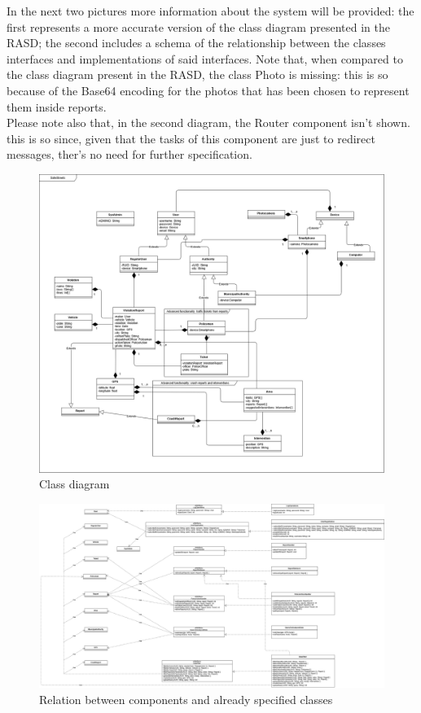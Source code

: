 In the next two pictures more information about the system will be provided: the first represents a more accurate version of the class diagram presented in the RASD; the second includes a schema of the relationship between the classes interfaces and implementations of said interfaces. \newline
Note that, when compared to the class diagram present in the RASD, the class Photo is missing: this is so because of the Base64 encoding for the photos that has been chosen to represent them inside reports.\\
Please note also that, in the second diagram, the Router component isn't shown. this is so since, given that the tasks of this component are just to redirect messages, ther's no need for further specification.

\begin{figure}[H]
	\centering
	\includegraphics[angle=90, scale=0.30]{Images/ADV_class_diagram}
	\caption{Class diagram}
\end{figure}
\newpage

\begin{figure}[H]
	\centering
	\includegraphics[angle=90, scale=0.25]{Images/component_class_relation}
	\caption{Relation between components and already specified classes}
\end{figure}
\newpage

